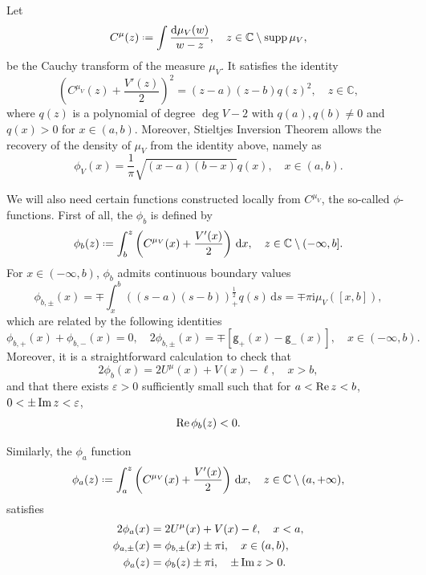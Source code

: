 \documentclass[reqno,a4paper,11pt]{amsart}
\DeclareMathOperator{\supp}{supp}
\renewcommand{\Re}{\mathop{\rm Re}}
\renewcommand{\Im}{\mathop{\rm Im}}
\newcommand{\C}{\mathbb{C}}
\newcommand{\ii}{\mathrm{i}}
\newcommand{\dd}{\mathrm{d}}
\newcommand{\msf}{\mathsf}
\theoremstyle{definition}
\theoremstyle{remark}
\numberwithin{equation}{section}
\newcommand*{\defeq}{\mathrel{\vcenter{\baselineskip0.5ex \lineskiplimit0pt
                     \hbox{\scriptsize.}\hbox{\scriptsize.}}}%
                     =}
\begin{document}
    Let 
    $$
    C^\mu(z) \defeq \int \frac{\dd \mu_V(w)}{w-z},\quad z\in \C\setminus \supp\mu_V,
    $$
    be the Cauchy transform of the measure $\mu_V$. It satisfies the identity
    \begin{equation}\label{eq:CauchyTransform_AlgebraicEq}
        \left( C^{\mu_V}(z) + \frac{V'(z)}{2} \right)^2 = (z-a)(z-b) q(z)^2,\quad z\in \C,
    \end{equation}
    where $q(z)$ is a polynomial of degree $\deg V - 2$ with $q(a), q(b) \neq 0$ and $q(x)>0$ for $x\in(a,b)$. 
    Moreover, Stieltjes Inversion Theorem allows the recovery of the density of $\mu_V$ from the identity above, namely as
    \[
        \phi_V(x) = \frac{1}{\pi} \sqrt{(x-a)(b-x)} q(x), \quad x \in (a,b).
    \]

We will also need certain functions constructed locally from $C^{\mu_V}$, the so-called $\phi$-functions. First of all, the $\phi_b$ is defined by
    \begin{equation}\label{eq:phi_b}
        \phi_b(z) 
            \defeq \int_b^z \left( C^{\mu_V}(x) + \frac{V'(x)}{2}  \right) \, \dd x, \quad z \in \C \setminus (-\infty,b].
    \end{equation}    
    For $x \in (-\infty,b)$, $\phi_b$ admits continuous boundary values 
    \begin{equation} \label{eq:eta_b_pm}
        \phi_{b,\pm}(x) = \mp \int_x^b ((s-a)(s-b))^{\frac{1}{2}}_+ q(s) \, \dd s = \mp \pi \ii  \mu_V([x,b]),
    \end{equation}
    which are related by the following identities
    \begin{equation}\label{eq:phibg}
        \phi_{b,+}(x) + \phi_{b,-}(x) = 0, \quad 2 \phi_{b,\pm}(x) = \mp [ \msf g_+(x) - \msf g_-(x)]
        , \quad x \in (-\infty,b).
    \end{equation}
    Moreover, it is a straightforward calculation to check that
    \begin{equation}\label{eq:phibV}
        2\phi_b(x) = 2U^\mu(x) + V(x) - \ell, \quad x > b,
    \end{equation}
    and that there exists $\varepsilon > 0$ sufficiently small such that for $a < \Re z < b$, $0 < \pm \Im z < \varepsilon$,
    \[
        \Re \phi_b(z) < 0. 
    \]
    
    Similarly, the $\phi_a$ function
    \begin{equation}\label{eq:phi_a}
        \phi_a(z) \defeq \int_a^z \left( C^{\mu_V}(x) + \frac{V'(x)}{2}\right) \, \dd x, \quad z \in \C \setminus (a,+\infty),
    \end{equation}
    satisfies
    \begin{equation}\label{eq:properties_of_phi_a}
        \begin{split}
        2 \phi_a(x) &= 2U^\mu(x) + V(x) - \ell, \quad x < a, \\
        \phi_{a, \pm}(x) &= \phi_{b, \pm}(x) \pm \pi \ii, \quad x \in (a,b), \\
        \phi_a(z) &= \phi_b(z) \pm \pi \ii, \quad \pm \Im z > 0.
        \end{split}
    \end{equation}
\end{document}
